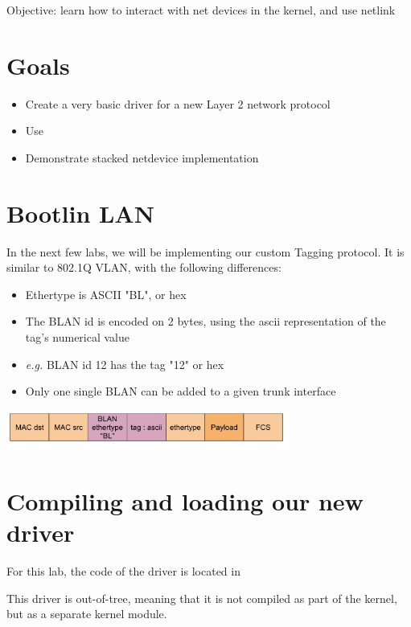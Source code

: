 {Objective: learn how to interact with net devices in the kernel, and use netlink}

\section{Goals}
 
 \begin{itemize}
 \item Create a very basic driver for a new Layer 2 network protocol
 \item Use 
 \item Demonstrate stacked netdevice implementation
 \end{itemize}

\section{Bootlin LAN}

In the next few labs, we will be implementing our custom Tagging protocol. It is similar to 802.1Q VLAN, with the following differences:

\begin{itemize}
	\item Ethertype is ASCII "BL", or hex 
	\item The BLAN id is encoded on 2 bytes, using the ascii representation of the tag's numerical value
	\item \textit{e.g.} BLAN id 12 has the tag "12" or hex 
	\item Only one single BLAN can be added to a given trunk interface
\end{itemize}

\includegraphics[width=0.7\textwidth]{labs/networking-netlink/ethernet_frame_blan.pdf}
 
\section{Compiling and loading our new driver}

For this lab, the code of the driver is located in 

This driver is out-of-tree, meaning that it is not compiled as part of the kernel, but as a separate kernel module.

